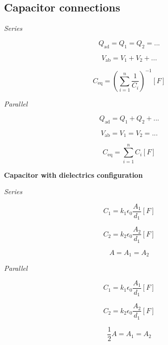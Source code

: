 \documentclass[letterpaper]{article}
\newcommand{\divline}{\noindent\makebox[\linewidth]{\rule{\textwidth}{0.4pt}}}
\begin{document}
    \divline
    \begin{multicols}{3}
        \section{Capacitor connections}

        \textit{Series}

        \[Q_{\text{ad}} = Q_{1} = Q_{2} = ...\]

        \[V_{\text{ab}} = V_{1} + V_{2} + ...\]

        \[C_{\text{eq}} = \left( \sum_{i = 1}^{n} \frac{1}{C_{i}} \right)^{-1} [F]\]

        \textit{Parallel}

        \[Q_{\text{ad}} = Q_{1} + Q_{2} + ...\]

        \[V_{\text{ab}} = V_{1} = V_{2} = ...\]

        \[C_{\text{eq}} = \sum_{i = 1}^{n} C_{i} [F]\]
        

        \textbf{Capacitor with dielectrics configuration}

        \textit{Series}

        \[C_{1} = k_{1} \epsilon_{0} \frac{A_{1}}{d_{1}} [F]\]

        \[C_{2} = k_{2} \epsilon_{0} \frac{A_{2}}{d_{1}} [F]\]

        \[A = A_{1} = A_{2}\]

        \textit{Parallel}

        \[C_{1} = k_{1} \epsilon_{0} \frac{A_{1}}{d_{1}} [F]\]

        \[C_{2} = k_{2} \epsilon_{0} \frac{A_{2}}{d_{1}} [F]\]

        \[\frac{1}{2} A = A_{1} = A_{2}\]
        
    \end{multicols}
\end{document}
